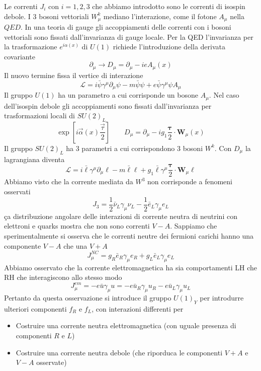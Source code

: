 Le correnti $J_i$ con $i=1,2,3$ che abbiamo introdotto sono le correnti di isospin debole. I $3$ bosoni vettoriali $W^k_\mu$ mediano l'interazione, come il fotone $A_\mu$ nella $QED$. In una teoria di gauge gli accoppiamenti delle correnti con i bosoni vettoriali sono fissati dall'invarianza di gauge locale. Per la QED l'invarianza per la trasformazione $e^{i\alpha(x)}$ di $U(1)$ richiede l'introduzione della derivata covariante
$$\partial_\mu \rightarrow D_\mu = \partial_\mu - ieA_\mu(x)$$
Il nuovo termine fissa il vertice di interazione
$$\mathcal{L} = i\bar{\psi}\gamma^\mu\partial_\mu\psi - m\bar{\psi}\psi + e\bar{\psi}\gamma^\mu\psi A_\mu$$
Il gruppo $U(1)$ ha un parametro a cui corrisponde un bosone $A_\mu$. Nel caso dell'isospin debole gli accoppiamenti sono fissati dall'invarianza per trasformazioni locali di $SU(2)_L$
$$\exp\left[i\vec{\alpha}(x)\frac{\vec{\tau}}{2}\right] \qquad D_\mu = \partial_\mu - ig_1\frac{\boldsymbol{\tau}}{2} \cdot \mathbf{W}_\mu(x)$$
Il gruppo $SU(2)_L$ ha 3 parametri a cui corrispondono 3 bosoni $W^k$. Con $D_\mu$ la lagrangiana diventa
$$\mathcal{L} = i\bar{\ell}\gamma^\mu\partial_\mu\ell - m\bar{\ell}\ell + g_1\bar{\ell}\gamma^\mu\frac{\boldsymbol{\tau}}{2} \cdot \mathbf{W}_\mu\ell$$
Abbiamo visto che la corrente mediata da $W^3$ non corrisponde a fenomeni osservati
$$J_3 = \frac{1}{2}\bar{\nu}_L\gamma_\mu\nu_L - \frac{1}{2}\bar{e}_L\gamma_\mu e_L$$
ça distribuzione angolare delle interazioni di corrente neutra di neutrini con elettroni e quarks mostra che non sono correnti $V-A$. Sappiamo che sperimentalmente si osserva che le correnti neutre dei fermioni carichi hanno una componente $V-A$ che una $V+A$
$$J_\mu^{NC} = g_R\bar{e}_R\gamma_\mu e_R + g_L\bar{e}_L\gamma_\mu e_L$$
Abbiamo osservato che la corrente elettromagnetica ha sia comportamenti LH che RH che interagiscono allo stesso modo
$$J_\mu^{em} = -e\bar{u}\gamma_\mu u = -e\bar{u}_R\gamma_\mu u_R - e\bar{u}_L\gamma_\mu u_L$$
Pertanto da questa osservazione si introduce il gruppo $U(1)_Y$ per introdurre ulteriori componenti $f_R$ e $f_L$, con interazioni differenti per
\begin{itemize}
	\item Costruire una corrente neutra elettromagnetica (con uguale presenza di componenti $R$ e $L$)
	\item  Costruire una corrente neutra debole (che riporduca le componenti $V+A$ e $V-A$ osservate)
\end{itemize}

